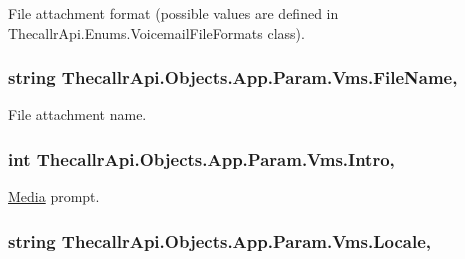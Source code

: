 File attachment format (possible values are defined in Thecallr\+Api.\+Enums.\+Voicemail\+File\+Formats class). 

\hypertarget{class_thecallr_api_1_1_objects_1_1_app_1_1_param_1_1_vms_a24db06489db2f2a78cb9cf2325792787}{
\subsubsection[{File\+Name}]{\setlength{\rightskip}{0pt plus 5cm}string Thecallr\+Api.\+Objects.\+App.\+Param.\+Vms.\+File\+Name\hspace{0.3cm}{\ttfamily [get]}, {\ttfamily [set]}}}\label{class_thecallr_api_1_1_objects_1_1_app_1_1_param_1_1_vms_a24db06489db2f2a78cb9cf2325792787}


File attachment name. 

\hypertarget{class_thecallr_api_1_1_objects_1_1_app_1_1_param_1_1_vms_aa9fb2d9fe59dc28f3a8cb192f3af7be4}{
\subsubsection[{Intro}]{\setlength{\rightskip}{0pt plus 5cm}int Thecallr\+Api.\+Objects.\+App.\+Param.\+Vms.\+Intro\hspace{0.3cm}{\ttfamily [get]}, {\ttfamily [set]}}}\label{class_thecallr_api_1_1_objects_1_1_app_1_1_param_1_1_vms_aa9fb2d9fe59dc28f3a8cb192f3af7be4}


\hyperlink{namespace_thecallr_api_1_1_objects_1_1_media}{Media} prompt. 

\hypertarget{class_thecallr_api_1_1_objects_1_1_app_1_1_param_1_1_vms_af0d9b7c568758a880708e66aad5088da}{
\subsubsection[{Locale}]{\setlength{\rightskip}{0pt plus 5cm}string Thecallr\+Api.\+Objects.\+App.\+Param.\+Vms.\+Locale\hspace{0.3cm}{\ttfamily [get]}, {\ttfamily [set]}}}\label{class_thecallr_api_1_1_objects_1_1_app_1_1_param_1_1_vms_af0d9b7c568758a880708e66aad5088da}


